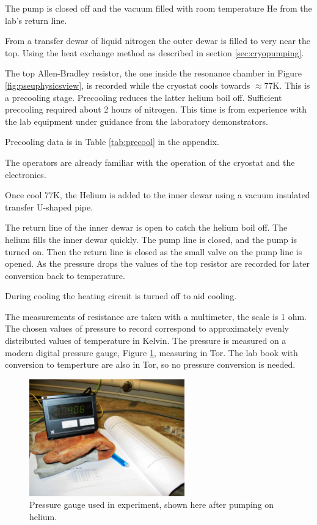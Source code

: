 The pump is closed off and the vacuum filled with room temperature He from
the lab's return line.

From a transfer dewar of liquid nitrogen the outer dewar is filled
to very near the top. Using the heat exchange method
as described in section \ref{sec:cryopumping}.

The top Allen-Bradley resistor, the one inside the resonance chamber in  Figure \ref{fig:pseuphysicsview},
 is recorded while the cryostat cools towards
$\approx 77$K. This is a precooling stage.
Precooling reduces the latter helium boil off.
Sufficient precooling required about 2 hours of nitrogen.
This time is from experience with the lab equipment under
guidance from the laboratory demonstrators.

Precooling data is in Table \ref{tab:precool} in the appendix.

The operators are already familiar with the operation of the cryostat and the 
electronics.

Once cool 77K, the Helium is added to the inner dewar using a vacuum insulated transfer
U-shaped pipe.

The return line of the inner dewar is open to catch the helium boil off.
The helium fills the inner dewar quickly.
The pump line is closed, and the pump is turned on.
Then the return line is closed as the small valve on the pump line is opened.
As the pressure drops the values of the top resistor are recorded
for later conversion back to temperature.

During cooling the heating circuit is turned off to aid cooling.

The measurements of resistance are taken with a multimeter,
the scale is 1 ohm.
The chosen values of pressure to record correspond to approximately evenly
distributed values of temperature in Kelvin.
The pressure is measured on a modern digital pressure gauge, Figure \ref{fig:pressuregague}, measuring in Tor.
The lab book with conversion to temperture are also in Tor, so no pressure conversion
is needed.

\begin{figure}[htb]
\centering
\includegraphics[width = 0.6\textwidth]{pics/pressuregague.JPG}
\caption{Pressure gauge used in experiment, shown here after pumping on helium.\label{fig:pressuregague}}
\end{figure}

